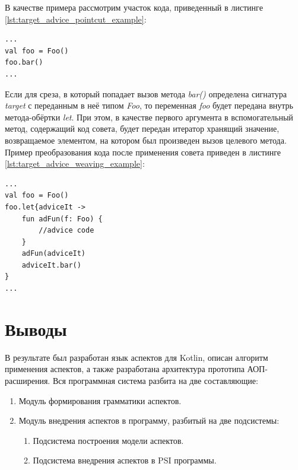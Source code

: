 В качестве примера рассмотрим участок кода, приведенный в листинге
\ref{lst:target_advice_pointcut_example}:
\begin{lstlisting}[style={java}, label=lst:target_advice_pointcut_example,
    caption={Пример точки внедрения}]
...
val foo = Foo()
foo.bar()
...
\end{lstlisting}
Если для среза, в который попадает вызов метода \textit{bar()} определена
сигнатура \textit{target} с переданным в неё типом \textit{Foo}, то переменная
\textit{foo} будет передана внутрь метода-обёртки \textit{let}.
При этом, в качестве первого аргумента в вспомогательный метод, содержащий код совета, будет передан итератор хранящий значение, возвращаемое элементом, на котором был произведен вызов целевого метода.
Пример преобразования кода после применения совета приведен в листинге
\ref{lst:target_advice_weaving_example}:
\begin{lstlisting}[style={java}, label=lst:target_advice_weaving_example,
    caption={Пример применения совета, имеющего сигнатуру \textit{target}}]
...
val foo = Foo()
foo.let{adviceIt ->
	fun adFun(f: Foo) {
		//advice code
	}
	adFun(adviceIt)
	adviceIt.bar()
}
...
\end{lstlisting}

\section{Выводы}
\label{sec:design_conclusion}
В результате был разработан язык аспектов для Kotlin,
описан алгоритм применения аспектов, а также разработана архитектура прототипа АОП-расширения.
Вся программная система разбита на две составляющие:
\begin{enumerate}
	\item Модуль формирования грамматики аспектов.
	\item Модуль внедрения аспектов в программу, разбитый на две подсистемы:
	\begin{enumerate}
		\item Подсистема построения модели аспектов.
		\item Подсистема внедрения аспектов в PSI программы.
	\end{enumerate}
\end{enumerate}
